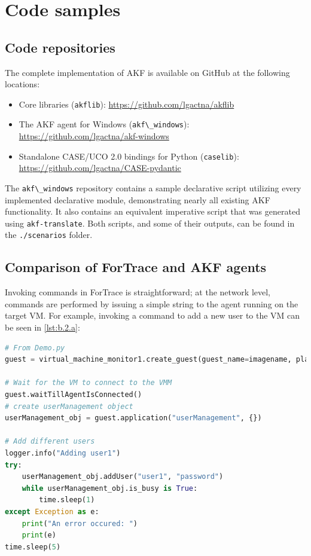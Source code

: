 \documentclass[letterpaper,12pt]{report}
\def\tightlist{}
\newcommand{\passthrough}[1]{#1}
\begin{document}
\chapter{Code samples}\label{appendix-b}

\section{Code repositories}\label{code-repositories}

The complete implementation of AKF is available on GitHub at the
following locations:

\begin{itemize}
\tightlist
\item
  Core libraries (\passthrough{\lstinline!akflib!}):
  \url{https://github.com/lgactna/akflib}
\item
  The AKF agent for Windows (\passthrough{\lstinline!akf\_windows!}):
  \url{https://github.com/lgactna/akf-windows}
\item
  Standalone CASE/UCO 2.0 bindings for Python
  (\passthrough{\lstinline!caselib!}):
  \url{https://github.com/lgactna/CASE-pydantic}
\end{itemize}

The \passthrough{\lstinline!akf\_windows!} repository contains a sample
declarative script utilizing every implemented declarative module,
demonstrating nearly all existing AKF functionality. It also contains an
equivalent imperative script that was generated using
\passthrough{\lstinline!akf-translate!}. Both scripts, and some of their
outputs, can be found in the \passthrough{\lstinline!./scenarios!}
folder.

\section{Comparison of ForTrace and AKF
agents}\label{comparison-of-fortrace-and-akf-agents}

Invoking commands in ForTrace
\cite{gobelForTraceHolisticForensic2022} is straightforward; at the
network level, commands are performed by issuing a simple string to the
agent running on the target VM. For example, invoking a command to add a
new user to the VM can be seen in \autoref{lst:b.2.a}:

\begin{lstlisting}[label={lst:b.2.a}, caption={Creating a new user through ForTrace agent commands}, language=Python]
# From Demo.py
guest = virtual_machine_monitor1.create_guest(guest_name=imagename, platform="windows")

# Wait for the VM to connect to the VMM
guest.waitTillAgentIsConnected()
# create userManagement object
userManagement_obj = guest.application("userManagement", {})

# Add different users
logger.info("Adding user1")
try:
    userManagement_obj.addUser("user1", "password")
    while userManagement_obj.is_busy is True:
        time.sleep(1)
except Exception as e:
    print("An error occured: ")
    print(e)
time.sleep(5)
\end{lstlisting}
\end{document}
